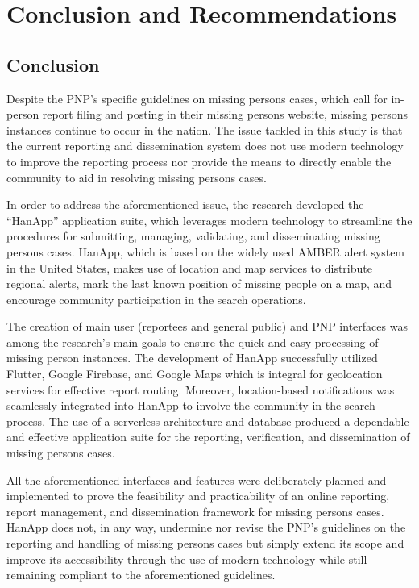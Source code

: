 \chapter{Conclusion and Recommendations}

\section{Conclusion}
Despite the PNP's specific guidelines on missing persons cases, which call for in-person report filing and posting in their missing persons website, missing persons instances continue to occur in the nation. The issue tackled in this study is that the current reporting and dissemination system does not use modern technology to improve the reporting process nor provide the means to directly enable the community to aid in resolving missing persons cases.

In order to address the aforementioned issue, the research developed the “HanApp” application suite, which leverages modern technology to streamline the procedures for submitting, managing, validating, and disseminating missing persons cases. HanApp, which is based on the widely used AMBER alert system in the United States, makes use of location and map services to distribute regional alerts, mark the last known position of missing people on a map, and encourage community participation in the search operations.

The creation of main user (reportees and general public) and PNP interfaces was among the research's main goals to ensure the quick and easy processing of missing person instances. The development of HanApp successfully utilized Flutter, Google Firebase, and Google Maps which is integral for geolocation services for effective report routing. Moreover, location-based notifications was seamlessly integrated into HanApp to involve the community in the search process. The use of a serverless architecture and database produced a dependable and effective application suite for the reporting, verification, and dissemination of missing persons cases. 

All the aforementioned interfaces and features were deliberately planned and implemented to prove the feasibility and practicability of an online reporting, report management, and dissemination framework for missing persons cases.  HanApp does not, in any way, undermine nor revise the PNP's guidelines on the reporting and handling of missing persons cases but simply extend its scope and improve its accessibility through the use of modern technology while still remaining compliant to the aforementioned guidelines.

